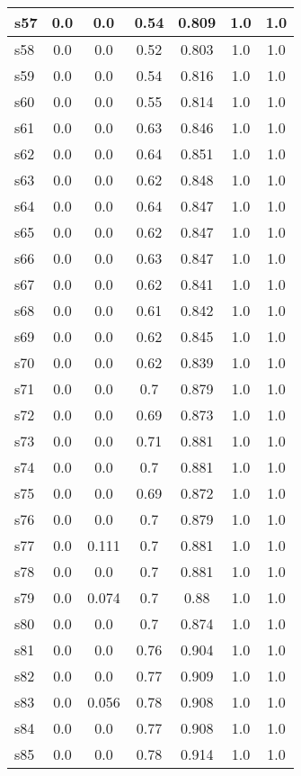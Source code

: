 \documentclass{article}
\begin{document}
\begin{tabular}{|l|c|c|c|c|c|c|}
\hline
s57 &0.0 & 0.0 & 0.54 & 0.809 & 1.0 & 1.0\\
\hline
s58 &0.0 & 0.0 & 0.52 & 0.803 & 1.0 & 1.0\\
\hline
s59 &0.0 & 0.0 & 0.54 & 0.816 & 1.0 & 1.0\\
\hline
s60 &0.0 & 0.0 & 0.55 & 0.814 & 1.0 & 1.0\\
\hline
s61 &0.0 & 0.0 & 0.63 & 0.846 & 1.0 & 1.0\\
\hline
s62 &0.0 & 0.0 & 0.64 & 0.851 & 1.0 & 1.0\\
\hline
s63 &0.0 & 0.0 & 0.62 & 0.848 & 1.0 & 1.0\\
\hline
s64 &0.0 & 0.0 & 0.64 & 0.847 & 1.0 & 1.0\\
\hline
s65 &0.0 & 0.0 & 0.62 & 0.847 & 1.0 & 1.0\\
\hline
s66 &0.0 & 0.0 & 0.63 & 0.847 & 1.0 & 1.0\\
\hline
s67 &0.0 & 0.0 & 0.62 & 0.841 & 1.0 & 1.0\\
\hline
s68 &0.0 & 0.0 & 0.61 & 0.842 & 1.0 & 1.0\\
\hline
s69 &0.0 & 0.0 & 0.62 & 0.845 & 1.0 & 1.0\\
\hline
s70 &0.0 & 0.0 & 0.62 & 0.839 & 1.0 & 1.0\\
\hline
s71 &0.0 & 0.0 & 0.7 & 0.879 & 1.0 & 1.0\\
\hline
s72 &0.0 & 0.0 & 0.69 & 0.873 & 1.0 & 1.0\\
\hline
s73 &0.0 & 0.0 & 0.71 & 0.881 & 1.0 & 1.0\\
\hline
s74 &0.0 & 0.0 & 0.7 & 0.881 & 1.0 & 1.0\\
\hline
s75 &0.0 & 0.0 & 0.69 & 0.872 & 1.0 & 1.0\\
\hline
s76 &0.0 & 0.0 & 0.7 & 0.879 & 1.0 & 1.0\\
\hline
s77 &0.0 & 0.111 & 0.7 & 0.881 & 1.0 & 1.0\\
\hline
s78 &0.0 & 0.0 & 0.7 & 0.881 & 1.0 & 1.0\\
\hline
s79 &0.0 & 0.074 & 0.7 & 0.88 & 1.0 & 1.0\\
\hline
s80 &0.0 & 0.0 & 0.7 & 0.874 & 1.0 & 1.0\\
\hline
s81 &0.0 & 0.0 & 0.76 & 0.904 & 1.0 & 1.0\\
\hline
s82 &0.0 & 0.0 & 0.77 & 0.909 & 1.0 & 1.0\\
\hline
s83 &0.0 & 0.056 & 0.78 & 0.908 & 1.0 & 1.0\\
\hline
s84 &0.0 & 0.0 & 0.77 & 0.908 & 1.0 & 1.0\\
\hline
s85 &0.0 & 0.0 & 0.78 & 0.914 & 1.0 & 1.0\\

\end{tabular}
\end{document}

